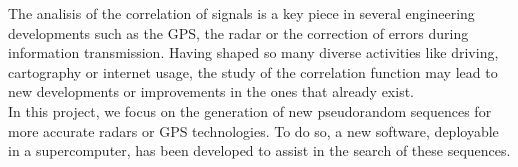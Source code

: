 The analisis of the correlation of signals is a key piece in several
engineering developments such as the GPS, the radar or the correction of errors
during information transmission. Having shaped so many diverse activities like
driving, cartography or internet usage, the study of the correlation function
may lead to new developments or improvements in the ones that already exist.\\

In this project, we focus on the generation of new pseudorandom sequences for
more accurate radars or GPS technologies. To do so, a new software, deployable
in a supercomputer, has been developed to assist in the search of these
sequences.
